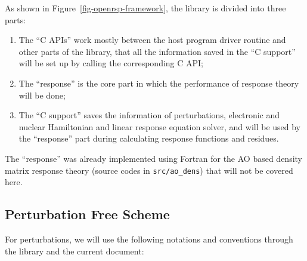 As shown in Figure~\ref{fig-openrsp-framework}, the \LibName library is divided
into three parts:
\begin{enumerate}
  \item The ``\LibName C APIs'' work mostly between the host program driver
    routine and other parts of the \LibName library, that all the information
    saved in the ``\LibName C support'' will be set up by calling the
    corresponding \LibName C API;
  \item The ``\LibName response'' is the core part in which the performance
    of response theory will be done;
  \item The ``\LibName C support'' saves the information of perturbations,
    electronic and nuclear Hamiltonian and linear response equation solver,
    and will be used by the ``\LibName response'' part during calculating
    response functions and residues.
\end{enumerate}

The ``\LibName response'' was already implemented using Fortran for the AO
based density matrix response theory (source codes in \texttt{src/ao\_dens})
that will not be covered here.

\subsection{Perturbation Free Scheme}
\label{subsection-perturbation-free}

For perturbations, we will use the following notations and conventions through
the \LibName library and the current document:

